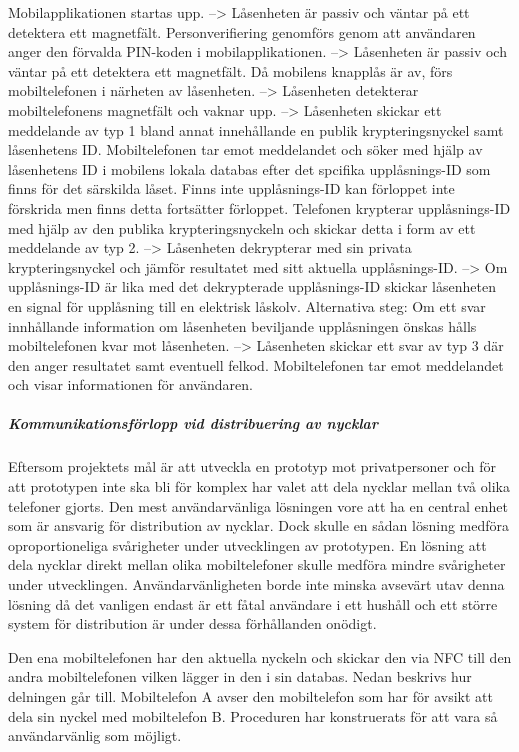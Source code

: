 \documentclass[11pt]{article}
\begin{document}
Mobilapplikationen startas upp. --> Låsenheten är passiv och väntar på ett detektera ett magnetfält. 
Personverifiering genomförs genom att användaren anger den förvalda PIN-koden i mobilapplikationen. --> Låsenheten är passiv och väntar på ett detektera ett magnetfält. 
Då mobilens knapplås är av, förs mobiltelefonen i närheten av låsenheten. --> Låsenheten detekterar mobiltelefonens magnetfält och vaknar upp.
 --> Låsenheten skickar ett meddelande av typ 1 bland annat innehållande en publik krypteringsnyckel samt låsenhetens ID.
Mobiltelefonen tar emot meddelandet och söker med hjälp av låsenhetens ID i mobilens lokala databas efter det spcifika upplåsnings-ID som finns för det särskilda låset.
Finns inte upplåsnings-ID kan förloppet inte förskrida men finns detta fortsätter förloppet.
Telefonen krypterar upplåsnings-ID med hjälp av den publika krypteringsnyckeln och skickar detta i form av ett meddelande av typ 2.
 --> Låsenheten dekrypterar med sin privata krypteringsnyckel och jämför resultatet med sitt aktuella upplåsnings-ID.
 --> Om upplåsnings-ID är lika med det dekrypterade upplåsnings-ID skickar låsenheten en signal för upplåsning till en elektrisk låskolv.
Alternativa steg:
Om ett svar innhållande information om låsenheten beviljande upplåsningen önskas hålls mobiltelefonen kvar mot låsenheten.
 --> Låsenheten skickar ett svar av typ 3 där den anger resultatet samt eventuell felkod.
Mobiltelefonen tar emot meddelandet och visar informationen för användaren.

\subparagraph{Kommunikationsförlopp vid distribuering av nycklar
}
Eftersom projektets mål är att utveckla en prototyp mot privatpersoner och för att prototypen inte ska bli för komplex har valet att dela nycklar mellan två olika telefoner gjorts. Den mest användarvänliga lösningen vore att ha en central enhet som är ansvarig för distribution av nycklar. Dock skulle en sådan lösning medföra oproportioneliga svårigheter under utvecklingen av prototypen. En lösning att dela nycklar direkt mellan olika mobiltelefoner skulle medföra mindre svårigheter under utvecklingen. Användarvänligheten borde inte minska avsevärt utav denna lösning då det vanligen endast är ett fåtal användare i ett hushåll och ett större system för distribution är under dessa förhållanden onödigt.

Den ena mobiltelefonen har den aktuella nyckeln och skickar den via NFC till den andra mobiltelefonen vilken lägger in den i sin databas.  Nedan beskrivs hur delningen går till. Mobiltelefon A avser den mobiltelefon som har för avsikt att dela sin nyckel med mobiltelefon B. Proceduren har konstruerats för att vara så användarvänlig som möjligt.
\end{document}
